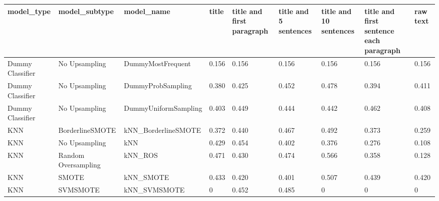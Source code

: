 \begin{tabular}{lllllllll}
\toprule
                  model\_type &       model\_subtype &                                   model\_name & title & title and first paragraph & title and 5 sentences & title and 10 sentences & title and first sentence each paragraph &  raw text \\
\midrule
            Dummy Classifier &       No Upsampling &                            DummyMostFrequent & 0.156 &                     0.156 &                 0.156 &                  0.156 &                                   0.156 &     0.156 \\
            Dummy Classifier &       No Upsampling &                            DummyProbSampling & 0.380 &                     0.425 &                 0.452 &                  0.478 &                                   0.394 &     0.411 \\
            Dummy Classifier &       No Upsampling &                         DummyUniformSampling & 0.403 &                     0.449 &                 0.444 &                  0.442 &                                   0.462 &     0.408 \\
                         KNN &     BorderlineSMOTE &                          kNN\_BorderlineSMOTE & 0.372 &                     0.440 &                 0.467 &                  0.492 &                                   0.373 &     0.259 \\
                         KNN &       No Upsampling &                                          kNN & 0.429 &                     0.454 &                 0.402 &                  0.376 &                                   0.276 &     0.108 \\
                         KNN & Random Oversampling &                                      kNN\_ROS & 0.471 &                     0.430 &                 0.474 &                  0.566 &                                   0.358 &     0.128 \\
                         KNN &               SMOTE &                                    kNN\_SMOTE & 0.433 &                     0.420 &                 0.401 &                  0.507 &                                   0.439 &     0.420 \\
                         KNN &            SVMSMOTE &                                 kNN\_SVMSMOTE &     0 &                     0.452 &                 0.485 &                      0 &                                       0 &         0 \\

\end{tabular}

